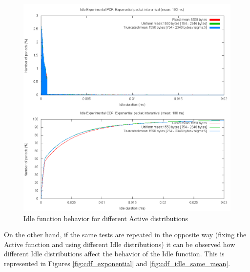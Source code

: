 
\begin{figure}[t]
	\centering
	\includegraphics[scale=0.28, trim = 0mm 0mm 6mm 0mm, clip]{images/results/GlobalView/cdf_composed}
	\caption{Idle function behavior for different Active distributions}
	\label{fig:cdf_composed}
\end{figure}

On the other hand, if the same tests are repeated in the opposite way (fixing the Active function and using different Idle distributions) it can be observed how different Idle distributions affect the behavior of the Idle function. This is represented in Figures \ref{fig:cdf_exponential} and \ref{fig:cdf_idle_same_mean}.

